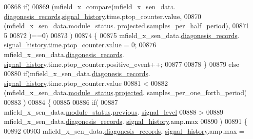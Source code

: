 \begin{DoxyCode}
{{00868                    \textcolor{keywordflow}{if}(
00869                       (\hyperlink{a00052_adf290c10214480d55f3631c1760188b0}{mfield\_x\_compare}(mfield\_x\_sen\_data.
      \hyperlink{a00025_a2bd79ce84bbd6b7f50d38954f7ae475e}{diagonesis\_records}.\hyperlink{a00019_ab7038f4de1f77b52a7f89e9f77c0b846}{signal\_history}.time.ptop\_counter.value,
00870                            (mfield\_x\_sen\_data.\hyperlink{a00025_adfab5a5d8b45a93dfb13edb24e2b80e3}{module\_status}.
      \hyperlink{a00019_af2267fb093fb5dcaa006a570a6da3b6b}{projected}.samples\_per\_half\_period),
00871                            5
00872                       )==0)
00873                    )
00874                    \{
00875                        mfield\_x\_sen\_data.\hyperlink{a00025_a2bd79ce84bbd6b7f50d38954f7ae475e}{diagonesis\_records}.
      \hyperlink{a00019_ab7038f4de1f77b52a7f89e9f77c0b846}{signal\_history}.time.ptop\_counter.value = 0;
00876                        mfield\_x\_sen\_data.\hyperlink{a00025_a2bd79ce84bbd6b7f50d38954f7ae475e}{diagonesis\_records}.
      \hyperlink{a00019_ab7038f4de1f77b52a7f89e9f77c0b846}{signal\_history}.time.ptop\_counter.positive\_event++;
00877 
00878                    \}
00879                    \textcolor{keywordflow}{else}
00880                    \textcolor{keywordflow}{if}(mfield\_x\_sen\_data.\hyperlink{a00025_a2bd79ce84bbd6b7f50d38954f7ae475e}{diagonesis\_records}.
      \hyperlink{a00019_ab7038f4de1f77b52a7f89e9f77c0b846}{signal\_history}.time.ptop\_counter.value
00881                            <
00882                       (mfield\_x\_sen\_data.\hyperlink{a00025_adfab5a5d8b45a93dfb13edb24e2b80e3}{module\_status}.\hyperlink{a00019_af2267fb093fb5dcaa006a570a6da3b6b}{projected}.
      samples\_per\_one\_forth\_period)
00883                    )
00884                    \{
00885 
00886                     \textcolor{keywordflow}{if}(
00887                      mfield\_x\_sen\_data.\hyperlink{a00025_adfab5a5d8b45a93dfb13edb24e2b80e3}{module\_status}.\hyperlink{a00019_adcb859b2f3983a9c58deab28e59c333f}{previous}.
      \hyperlink{a00019_a4070db8eab0ff93e3fbc1df59872f117}{signal\_level}
00888                       >
00889                      mfield\_x\_sen\_data.\hyperlink{a00025_a2bd79ce84bbd6b7f50d38954f7ae475e}{diagonesis\_records}.
      \hyperlink{a00019_ab7038f4de1f77b52a7f89e9f77c0b846}{signal\_history}.amp.max
00890                      )
00891                    \{
00892 
00903                        mfield\_x\_sen\_data.\hyperlink{a00025_a2bd79ce84bbd6b7f50d38954f7ae475e}{diagonesis\_records}.
      \hyperlink{a00019_ab7038f4de1f77b52a7f89e9f77c0b846}{signal\_history}.amp.max =
}}
\end{DoxyCode}
